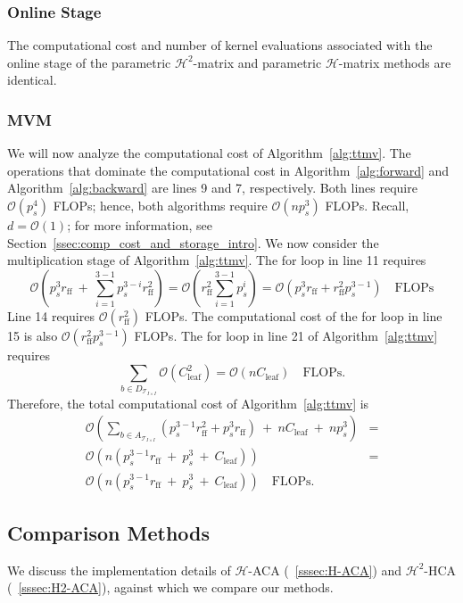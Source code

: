 \documentclass[final,3p,times]{elsarticle}
\newcommand{\mc}[1]{\mathcal{#1}}
\begin{document}
\subsubsection{Online Stage}
The computational cost and number of kernel evaluations associated with the online stage of the parametric $\mc{H}^{2}$-matrix and parametric $\mc{H}$-matrix methods are identical. 



\subsubsection{MVM}
We will now analyze the computational cost of Algorithm~\ref{alg:ttmv}.
The operations that dominate the computational cost in Algorithm~\ref{alg:forward} and Algorithm~\ref{alg:backward} are lines 9 and 7, respectively. Both lines require $ \mc{O}(p_s^{4})$ FLOPs;
hence, both algorithms require $\mc{O}(np_s^{3})$ FLOPs. Recall, $d  = \mc{O}(1)$; for more information, see Section~\ref{ssec:comp_cost_and_storage_intro}. We now consider the multiplication stage of Algorithm~\ref{alg:ttmv}. The for loop in line 11 requires 
$$\mc{O}(p_s^{3}r_{\text{ff}} ~  + ~ \sum_{i=1}^{3-1}p_{s}^{3-i}r_{\text{ff}}^2) = \mc{O}(r_{\text{ff}}^{2}\sum_{i=1}^{3-1}p_s^{i}) = \mc{O}(p_s^3r_{\text{ff}} + r_{\text{ff}}^2p_{s}^{3-1}) \quad \text{FLOPs}$$
Line 14 requires $\mc{O}(r_{\text{ff}}^2)$ FLOPs.
The computational cost of the for loop in line 15 is also $\mc{O}(r_{\text{ff}}^2p_s^{3-1})$ FLOPs. 
The for loop in line 21 of Algorithm~\ref{alg:ttmv} requires
$$\sum_{b \in D_{\mc{T}_{I \times I}}}\mc{O}(C_{\text{leaf}}^2) =  \mc{O}(nC_{\text{leaf}}) \quad \text{FLOPs}.$$
Therefore, the total computational cost of Algorithm~\ref{alg:ttmv} is
\begin{align*}
    \mc{O}(\sum_{b \in A_{\mc{T}_{I \times I}}}(p_s^{3-1}r_{\text{ff}}^2 + p_s^{3}r_{\text{ff}}) ~ + ~  nC_{\text{leaf}}  ~ + ~ np_s^3)  &= \\ \mc{O}(n ( p_s^{3-1}r_{\text{ff}}  ~ + ~ p_s^{3} ~ + ~ C_{\text{leaf}}))  &= \\ \mc{O}(n (p_s^{3-1}r_{\text{ff}}  ~ + ~  p_s^3 ~ + ~ C_{\text{leaf}})) \quad \text{FLOPs}.
\end{align*}









\subsection{Comparison Methods}
We discuss the implementation details of $\mc{H}$-ACA (~\ref{sssec:H-ACA}) and $\mc{H}^2$-HCA (~\ref{sssec:H2-ACA}), against which we compare our methods. 
\end{document}
